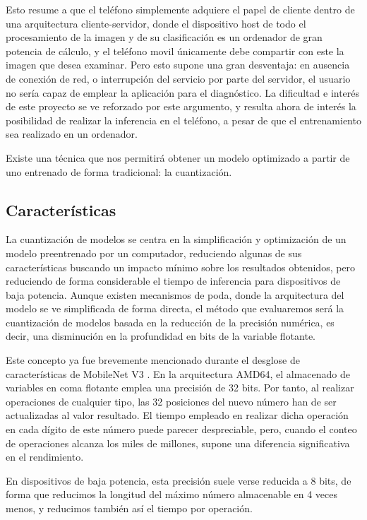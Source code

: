 Esto resume a que el teléfono simplemente adquiere el papel de cliente dentro de una arquitectura cliente-servidor, donde el dispositivo host de todo el procesamiento de la imagen y de su clasificación es un ordenador de gran potencia de cálculo, y el teléfono movil únicamente debe compartir con este la imagen que desea examinar. Pero esto supone una gran desventaja: en ausencia de conexión de red, o interrupción del servicio por parte del servidor, el usuario no sería capaz de emplear la aplicación para el diagnóstico. La dificultad e interés de este proyecto se ve reforzado por este argumento, y resulta ahora de interés la posibilidad de realizar la inferencia en el teléfono, a pesar de que el entrenamiento sea realizado en un ordenador.

Existe una técnica que nos permitirá obtener un modelo optimizado a partir de uno entrenado de forma tradicional: la cuantización.

\subsection{Características}

La cuantización de modelos se centra en la simplificación y optimización de un modelo preentrenado por un computador, reduciendo algunas de sus características buscando un impacto mínimo sobre los resultados obtenidos, pero reduciendo de forma considerable el tiempo de inferencia para dispositivos de baja potencia. Aunque existen mecanismos de poda, donde la arquitectura del modelo se ve simplificada de forma directa, el método que evaluaremos será la cuantización de modelos basada en la reducción de la precisión numérica, es decir, una disminución en la profundidad en bits de la variable flotante.

Este concepto ya fue brevemente mencionado durante el desglose de características de MobileNet V3 \cite{howard2019searching}. En la arquitectura AMD64, el almacenado de variables en coma flotante emplea una precisión de 32 bits. Por tanto, al realizar operaciones de cualquier tipo, las 32 posiciones del nuevo número han de ser actualizadas al valor resultado. El tiempo empleado en realizar dicha operación en cada dígito de este número puede parecer despreciable, pero, cuando el conteo de operaciones alcanza los miles de millones, supone una diferencia significativa en el rendimiento. 

En dispositivos de baja potencia, esta precisión suele verse reducida a 8 bits, de forma que reducimos la longitud del máximo número almacenable en 4 veces menos, y reducimos también así el tiempo por operación.


